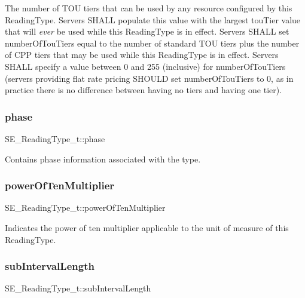 The number of T\+OU tiers that can be used by any resource configured by this Reading\+Type. Servers S\+H\+A\+LL populate this value with the largest tou\+Tier value that will {\itshape ever} be used while this Reading\+Type is in effect. Servers S\+H\+A\+LL set number\+Of\+Tou\+Tiers equal to the number of standard T\+OU tiers plus the number of C\+PP tiers that may be used while this Reading\+Type is in effect. Servers S\+H\+A\+LL specify a value between 0 and 255 (inclusive) for number\+Of\+Tou\+Tiers (servers providing flat rate pricing S\+H\+O\+U\+LD set number\+Of\+Tou\+Tiers to 0, as in practice there is no difference between having no tiers and having one tier). \mbox{\label{group__ReadingType_ga3857d20c24886f3715200ce0f9dd6f06}} 
\subsubsection{\texorpdfstring{phase}{phase}}
{\footnotesize\ttfamily S\+E\+\_\+\+Reading\+Type\+\_\+t\+::phase}

Contains phase information associated with the type. \mbox{\label{group__ReadingType_ga11cd4f657954c77645c4a09c3a7964a3}} 
\subsubsection{\texorpdfstring{power\+Of\+Ten\+Multiplier}{powerOfTenMultiplier}}
{\footnotesize\ttfamily S\+E\+\_\+\+Reading\+Type\+\_\+t\+::power\+Of\+Ten\+Multiplier}

Indicates the power of ten multiplier applicable to the unit of measure of this Reading\+Type. \mbox{\label{group__ReadingType_gaba391fb84126105e4f4d8f6428906b99}} 
\subsubsection{\texorpdfstring{sub\+Interval\+Length}{subIntervalLength}}
{\footnotesize\ttfamily S\+E\+\_\+\+Reading\+Type\+\_\+t\+::sub\+Interval\+Length}

